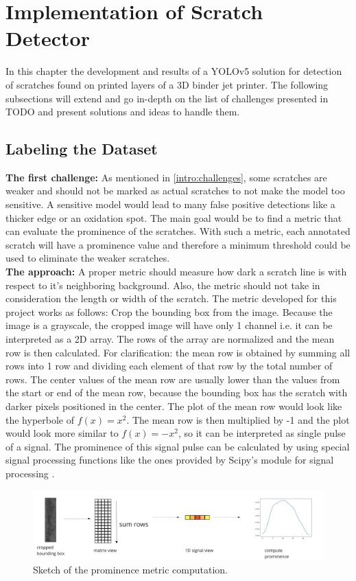 \section{Implementation of Scratch Detector}
In this chapter the development and results of a YOLOv5 solution for detection of scratches found on printed layers of a 3D binder jet printer. The following subsections will extend and go in-depth on the list of challenges presented in TODO and present solutions and ideas to handle them.

\subsection{Labeling the Dataset}

\textbf{The first challenge:}
As mentioned in \ref{intro:challenges}, some scratches are weaker and should not be marked as actual scratches to not make the model too sensitive. A sensitive model would lead to many false positive detections like a thicker edge or an oxidation spot. The main goal would be to find a metric that can evaluate the prominence of the scratches. With such a metric, each annotated scratch will have a prominence value and therefore a minimum threshold could be used to eliminate the weaker scratches. \\

\textbf{The approach:}
A proper metric should measure how dark a scratch line is with respect to it's neighboring background. Also, the metric should not take in consideration the length or width of the scratch.
The metric developed for this project works as follows:
Crop the bounding box from the image. Because the image is a grayscale, the cropped image will have only 1 channel i.e. it can be interpreted as a 2D array. The rows of the array are normalized and the mean row is then calculated. For clarification: the mean row is obtained by summing all rows into 1 row and dividing each element of that row by the total number of rows. The center values of the mean row are usually lower than the values from the start or end of the mean row, because the bounding box has the scratch with darker pixels positioned in the center. The plot of the mean row would look like the hyperbole of $f(x)=x^2$. The mean row is then multiplied by -1 and the plot would look more similar to $f(x)=-x^2$, so it can be interpreted as single pulse of a signal. The prominence of this signal pulse can be calculated by using special signal processing functions like the ones provided by Scipy's module for signal processing \cite{scipy_signal}. \\
\begin{figure}[!h]
\centering
\captionsetup{justification=centering,margin=2cm}
\includegraphics[width=\columnwidth]{images/implementation/prominence_metric}
\caption{Sketch of the prominence metric computation.}
\label{impl:prominence_metric}
\end{figure}


